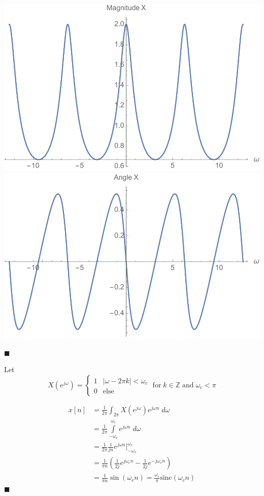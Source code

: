 \begin{example}
  \begin{center}
    \includegraphics[scale=0.5]{graphics/dtft-example1-Xmag.pdf}
    \includegraphics[scale=0.5]{graphics/dtft-example1-Xarg.pdf}
  \end{center}
  $\blacksquare$
\end{example}

\begin{example}
  Let 
  \[
  X\left(e^{j\omega}\right) = \left\{ \begin{array}{lc}
    1 & |\omega -2\pi k| < \omega_c\\
    0 & \text{else}
  \end{array}
  \right.
  \; \text{for}\; k\in\mathbb{Z} \;\text{and}\; \omega_c < \pi
  \]

  \begin{align*}
    x[n] &= \frac{1}{2\pi} \int_{2\pi} X\left(e^{j\omega}\right) e^{j\omega n} \; d\omega\\
    &= \frac{1}{2\pi} \int\limits_{-\omega_c}^{\omega_c}  e^{j\omega n} \; d\omega\\
    &= \frac{1}{2\pi} \frac{1}{jn} e^{j\omega n} \Bigg|_{-\omega_c}^{\omega_c}\\
    &= \frac{1}{\pi n} \left( \frac{1}{2j} e^{j\omega_c n} - \frac{1}{2j} e^{-j\omega_c n} \right)\\
    &= \frac{1}{\pi n} \sin(\omega_c n) = \frac{\omega_c}{\pi}\text{sinc}(\omega_c n)
  \end{align*}
  $\blacksquare$
\end{example}

